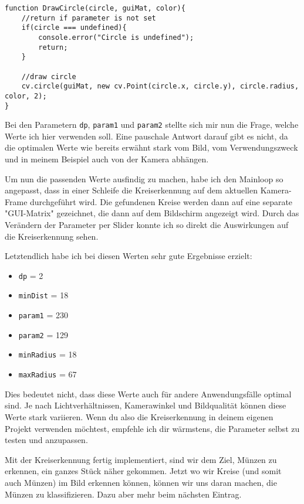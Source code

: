 \begin{lstlisting}[style=JavaScript]
function DrawCircle(circle, guiMat, color){
    //return if parameter is not set
    if(circle === undefined){
        console.error("Circle is undefined");
        return;
    }

    //draw circle
    cv.circle(guiMat, new cv.Point(circle.x, circle.y), circle.radius, color, 2);
}
\end{lstlisting}

Bei den Parametern \texttt{dp}, \texttt{param1} und \texttt{param2} stellte sich mir nun die Frage, welche Werte ich hier verwenden soll. Eine pauschale Antwort darauf gibt es nicht, da die optimalen Werte wie bereits erwähnt stark vom Bild, vom Verwendungszweck und in meinem Beispiel auch von der Kamera abhängen.

Um nun die passenden Werte ausfindig zu machen, habe ich den Mainloop so angepasst, dass in einer Schleife die Kreiserkennung auf dem aktuellen Kamera-Frame durchgeführt wird. Die gefundenen Kreise werden dann auf eine separate "GUI-Matrix" gezeichnet, die dann auf dem Bildschirm angezeigt wird. Durch das Verändern der Parameter per Slider konnte ich so direkt die Auswirkungen auf die Kreiserkennung sehen.

Letztendlich habe ich bei diesen Werten sehr gute Ergebnisse erzielt:
\begin{itemize}
    \item \texttt{dp} = 2
    \item \texttt{minDist} = 18
    \item \texttt{param1} = 230
    \item \texttt{param2} = 129
    \item \texttt{minRadius} = 18
    \item \texttt{maxRadius} = 67
\end{itemize}

Dies bedeutet nicht, dass diese Werte auch für andere Anwendungsfälle optimal sind. Je nach Lichtverhältnissen, Kamerawinkel und Bildqualität können diese Werte stark variieren. Wenn du also die Kreiserkennung in deinem eigenen Projekt verwenden möchtest, empfehle ich dir wärmstens, die Parameter selbst zu testen und anzupassen.

Mit der Kreiserkennung fertig implementiert, sind wir dem Ziel, Münzen zu erkennen, ein ganzes Stück näher gekommen. Jetzt wo wir Kreise (und somit auch Münzen) im Bild erkennen können, können wir uns daran machen, die Münzen zu klassifizieren. Dazu aber mehr beim nächsten Eintrag.